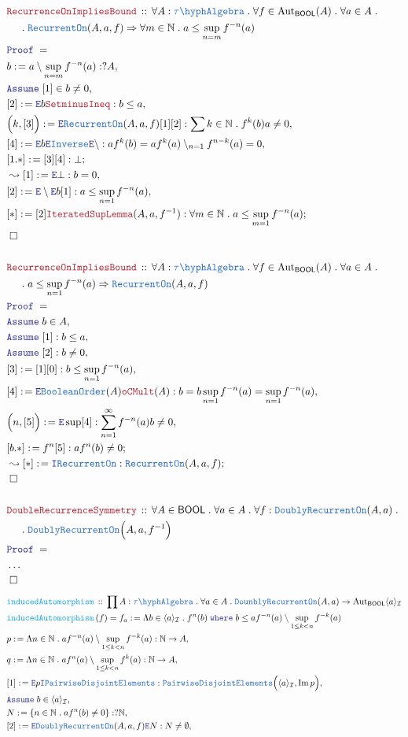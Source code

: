 \documentclass[12pt]{scrartcl}
\newcommand{\TYPE}[1]{\textcolor{NavyBlue}{\mathtt{#1}}}
\newcommand{\FUNC}[1]{\textcolor{Cerulean}{\mathtt{#1}}}
\newcommand{\LOGIC}[1]{\textcolor{Blue}{\mathtt{#1}}}
\newcommand{\THM}[1]{\textcolor{Maroon}{\mathtt{#1}}}
\renewcommand{\.}{\; . \;}
\newcommand{\de}{: \kern 0.1pc =}
\newcommand{\where}{\LOGIC{where}}
\newcommand{\Act}[1]{\left( #1 \right)}
\newcommand{\Theorem}[2]{& \THM{#1} \, :: \, #2 \\ & \Proof = \\ }
\newcommand{\DeclareFunc}[2]{& \FUNC{#1} \, :: \, #2 \\}
\newcommand{\DefineNamedFunc}[4]{&  \FUNC{#1}\Act{#2} = #3 \de #4 \\}
\newcommand{\NewLine}{\\ & \kern 1pc}
\newcommand{\Page}[1]{ \begin{align*} #1 \end{align*}   }
\newcommand{\NoProof}{ & \ldots \\ \EndProof}
\newcommand{\Imply}{\Rightarrow}
\newcommand{\Intro}{\LOGIC{I}}
\newcommand{\Elim}{\LOGIC{E}}
\newcommand{\Nat}{\mathbb{N} }
\DeclareMathOperator*{\im}{Im}
\newcommand{\Aut}{\mathrm{Aut}}
\newcommand{\Say}[3]{& #1 \de #2 : #3, \\}
\newcommand{\Conclude}[3]{& #1 \de #2 : #3; \\}
\newcommand{\Derive}[3]{& \leadsto #1 \de #2 : #3, \\}
\newcommand{\DeriveConclude}[3]{& \leadsto #1 \de #2 : #3 ; \\}
\newcommand{\Assume}[2]{& \LOGIC{Assume} \; #1 : #2, \\}
\newcommand{\AssumeIn}[2]{& \LOGIC{Assume} \; #1 \in #2, \\}
\newcommand{\QED}{\; \square}
\newcommand{\EndProof}{& \QED \\}
\newcommand{\Proof}{\LOGIC{Proof} \; }
\newcommand{\I}{\mathcal{I}}
\newcommand{\PD}{\TYPE{PairwiseDisjointElements}}
\newcommand{\TAlgebra}{\TYPE{\tau\hyph Algebra}}
\newcommand{\BOOL}{\mathsf{BOOL}}
\begin{document}
\Page{
	\Theorem{RecurrenceOnImpliesBound}
	{
		\forall A : \TAlgebra \.
		\forall f \in \Aut_\BOOL(A) \.
		\forall a \in A \.
		\NewLine \.
		\TYPE{RecurrentOn}(A,a,f)
		\Imply
		\forall m \in \Nat \.
		a \le \sup_{n=m} f^{-n}(a)
	}
	\Say{b}
	{
		a \setminus \sup_{n=m} f^{-n}(a)
	}{?A}
	\AssumeIn{[1]}{b \neq 0}
	\Say{[2]}{\Elim b \THM{SetminusIneq}}{ b \le a }
	\Say{\Big( k, [3]\Big)}{\Elim \TYPE{RecurrentOn}(A,a,f)[1][2]}
	{
		\sum k \in \Nat \.   f^k(b)a \neq 0 
	}
	\Say{[4]}{\Elim b \Elim \TYPE{Inverse} \Elim \setminus}
	{
		af^k(b) = 
		af^k(a)  \setminus_{n =1} f^{n-k}(a) =
		0 
	}
	\Conclude{[1.*]}{[3][4]}{\bot}
	\Derive{[1]}{\Elim \bot}{b  = 0 }
	\Say{[2]}{\Elim \setminus \Elim b [1]}
	{
		a \le \sup_{n=1} f^{-n}(a)	
	}
	\Conclude{[*]}{[2]\THM{IteratedSupLemma}(A,a,f^{-1})}
	{
		\forall m \in \Nat \. 
		a \le \sup_{m=1} f^{-n}(a)
	}
	\EndProof
	\\
	\Theorem{RecurrenceOnImpliesBound}
	{
		\forall A : \TAlgebra \.
		\forall f \in \Aut_\BOOL(A) \.
		\forall a \in A \.
		\NewLine \.
		a \le \sup_{n=1} f^{-n}(a)
		\Imply
		\TYPE{RecurrentOn}(A,a,f)
	}
	\AssumeIn{b}{A}
	\Assume{[1]}{b \le a}
	\Assume{[2]}{b \neq 0}
	\Say{[3]}{[1][0]}
	{
		b \le  \sup_{n=1} f^{-n}(a)
	}
	\Say{[4]}{\Elim \TYPE{BooleanOrder}(A)\THM{oCMult}(A)}
	{
		b = b \sup_{n=1} f^{-n}(a) =
		\sup_{n=1} f^{-n}(a)
	}
	\Say{\Big( n,[5]\Big)}{\Elim \sup [4]}
	{
		\sum_{n=1}^\infty f^{-n}(a)b \neq 0
	}
	\Conclude{[b.*]}{f^{n}[5]}
	{
				a f^n(b) \neq 0	
	}
	\DeriveConclude{[*]}{\Intro \TYPE{RecurrentOn}}
	{
		\TYPE{RecurrentOn}(A,a,f)
	}
	\EndProof	
	\\
	\Theorem{
		DoubleRecurrenceSymmetry	
	}
	{
		\forall A \in \BOOL \.
		\forall a \in A \.
		\forall f : \TYPE{DoublyRecurrentOn}(A,a) \. \NewLine \.
		\TYPE{DoublyRecurrentOn}\Big(A,a,f^{-1}\Big)	
	}
	\NoProof
}\Page{
	\DeclareFunc{inducedAutomorphism}
	{
		\prod A : \TAlgebra \.
		\forall a \in A  \.
		\TYPE{DounblyRecurrentOn}(A,a) \to
		\Aut_\BOOL\langle a \rangle_\I
	}
	\DefineNamedFunc{inducedAutomorphism}{f}
	{f_a}{
		\Lambda b \in \langle a \rangle_\I \.
		f^n(b) \;
 		\where \;		
 		b  \le  a f^{-n}(a) \setminus \sup_{1 \le k < n} f^{-k}(a)		
	}
	\Say{p}{\Lambda n \in \Nat \. af^{-n}(a) \setminus \sup_{1 \le k < n} f^{-k}(a)}
	{
		\Nat \to A
	}
	\Say{q}{\Lambda n \in \Nat \. af^{n}(a) \setminus \sup_{1 \le k < n} f^{k}(a)}
	{
		\Nat \to A
	}
	\Say{[1]}{\Elim p \Intro \PD}{\PD\Big(\langle a \rangle_\I,\im p\Big)}
	\AssumeIn{b}{\langle a \rangle_\I}
	\Say{N}{\{  n \in \Nat \.  af^{n}(b) \neq 0  \}}{?\Nat}
	\Say{[2]}{\Elim \TYPE{DoublyRecurrentOn}(A,a,f)\Elim N }{N \neq \emptyset}
}
\end{document}
